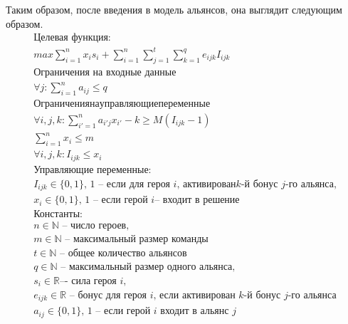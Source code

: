 \documentclass{article}
\begin{document}
Таким образом, после введения в модель альянсов, она выглядит следующим образом.
\begin{equation}
\begin{gathered}
\textbf{Целевая функция:}\\
max \sum_{i=1}^{n} x_i s_i + \sum_{i=1}^{n} \sum_{j=1}^{t}  \sum_{k=1}^{q} e_{ijk} I_{ijk} \\

\textbf{Ограничения на входные данные}\\
    
\forall{j} : \sum_{i=1}^n a_{ij} \le q \\

Ограничения на управляющие переменные \\
\forall{i,j,k} :  \sum_{i'=1}^{n} a_{i'j} x_{i'} - k \ge M( I_{ijk}  - 1) \\
\sum_{i=1}^n x_i \le m   \\ 


\forall{i,j,k} :  I_{ijk}  \le x_i \\


\text{Управляющие переменные:} \\
I_{ijk} \in \{0, 1\} \text {, 1 – если для героя } i \text{, активирован} k\text{-й бонус } j \text{-го альянса,} \\
x_i  \in \{0, 1\} \text{, 1 -- если герой } i \text{– входит в решение} \\

\textbf{Константы:} \\
n \in \mathbb{N} \text{ -- число героев,} \\
m \in \mathbb{N} \text{ -- максимальный размер команды}\\
t \in \mathbb{N} \text{ -- общее количество альянсов} \\
q \in \mathbb{N} \text{ -- максимальный размер одного альянса,} \\

s_i  \in \mathbb{R} \text{–- сила героя } i, \\
e_{ijk} \in \mathbb{R} \text{ -- бонус для героя } i \text{,  если активирован } k
\text{-й бонус } j \text{-го альянса} \\
a_{ij} \in \{0, 1\} \text{, 1 -- если герой } i \text{ входит в альянс } j \\ 
\end{gathered}
\end{equation}
\end{document}
